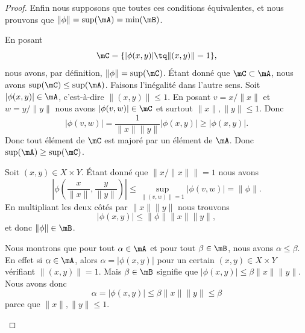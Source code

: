 \begin{proof}
	Enfin nous supposons que toutes ces conditions équivalentes, et nous prouvons que \( \| \phi \|=\sup(\mA)=\min(\mB)\).

	\begin{subproof}
		\spitem[\( \| \phi \|=\sup(\mA)\)]
		En posant
		\begin{equation}
			\mC=\{ | \phi(x,y) |\tq \| (x,y) \|=1 \},
		\end{equation}
		nous avons, par définition, \( \| \phi \|=\sup(\mC)\). Étant donné que \( \mC\subset\mA\), nous avons \( \sup(\mC)\leq \sup(\mA)\). Faisons l'inégalité dans l'autre sens. Soit \( | \phi(x,y) |\in\mA\), c'est-à-dire \( \| (x,y) \|\leq 1\). En posant \( v=x/\| x \|\) et \( w=y/\| y \|\) nous avons \( | \phi(v,w) |\in\mC\) et surtout \( \| x \|, \| y \|\leq 1\). Donc
		\begin{equation}
			| \phi(v,w) |=\frac{1}{ \| x \|\| y \| }| \phi(x,y) |\geq | \phi(x,y) |.
		\end{equation}
		Donc tout élément de \( \mC\) est majoré par un élément de \( \mA\). Donc \( \sup(\mA)\geq \sup(\mC)\).

		\spitem[\( \| \phi \|\in\mB\)]
		Soit \( (x,y)\in X\times Y\). Étant donné que \( \| x/\| x \| \|=1\) nous avons
		\begin{equation}
			\left| \phi\left( \frac{ x }{ \| x \| },\frac{ y }{ \| y \| } \right) \right|\leq \sup_{\| (v,w) \|=1}| \phi(v,w) |= \| \phi \|.
		\end{equation}
		En multipliant les deux côtés par \( \| x \|\| y \|\) nous trouvons
		\begin{equation}
			\left|   \phi(x,y) \right|\leq \| \phi \|\| x \|\| y \|,
		\end{equation}
		et donc \( \| \phi \|\in\mB\).

		Nous montrons que pour tout \( \alpha\in \mA\) et pour tout \( \beta\in\mB\), nous avons \( \alpha\leq \beta\). En effet si \( \alpha\in \mA\), alors \( \alpha=| \phi(x,y) |\) pour un certain \( (x,y)\in X\times Y\) vérifiant \( \| (x,y) \|=1\). Mais \( \beta\in \mB\) signifie que \( | \phi(x,y)|\leq \beta\| x \|  \| y \| \). Nous avons donc
		\begin{equation}
			\alpha=| \phi(x,y) |\leq \beta\| x \|\| y \|\leq \beta
		\end{equation}
		parce que \( \| x \|,\| y \|\leq 1\).
	\end{subproof}
\end{proof}

